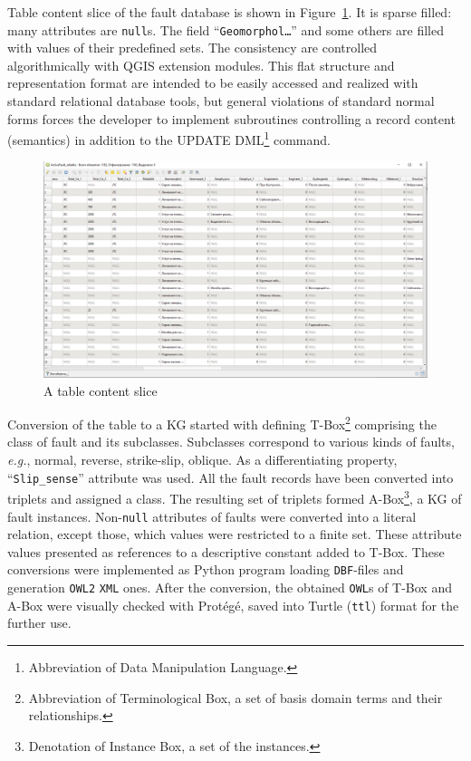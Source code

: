 \documentclass[
]{ceurart}
\begin{document}
  Table content slice of the fault database is shown in Figure~\ref{fig:db-slice}.  It is sparse filled: many attributes are \texttt{null}s.  The field ``\texttt{Geomorphol\ldots}'' and some others are filled with values of their predefined sets.  The consistency are controlled algorithmically with QGIS \cite{foss} extension modules.  This flat structure and representation format are intended to be easily accessed and realized with standard relational database tools, but general violations of standard normal forms forces the developer to implement subroutines controlling a record content (semantics) in addition to the UPDATE DML\footnote{Abbreviation of Data Manipulation Language.} command.

  \begin{figure}
    \centering
\includegraphics[width=\linewidth]{faults-leaflet-db-content.png}
    \caption{A table content slice}
    \label{fig:db-slice}
  \end{figure}

Conversion of the table to a KG started with defining T-Box\footnote{Abbreviation of Terminological Box, a set of basis domain terms and their relationships.} comprising the class of fault and its subclasses.  Subclasses correspond to various kinds of faults, \emph{e.g.}, normal, reverse, strike-slip, oblique.  As a differentiating property, ``\texttt{Slip\_sense}'' attribute was used.  All the fault records have been converted into triplets and assigned a class.  The resulting set of triplets formed A-Box\footnote{Denotation of Instance Box, a set of the instances.}, a KG of fault instances.  Non-\texttt{null} attributes of faults were converted into a literal relation, except those, which values were restricted to a finite set.  These attribute values presented as references to a descriptive constant added to T-Box.  These conversions were implemented as Python program loading \texttt{DBF}-files and generation \texttt{OWL2} \texttt{XML} ones.  After the conversion, the obtained \texttt{OWL}s of T-Box and A-Box were visually checked with Protégé, saved into Turtle (\texttt{ttl}) format for the further use.
\end{document}
